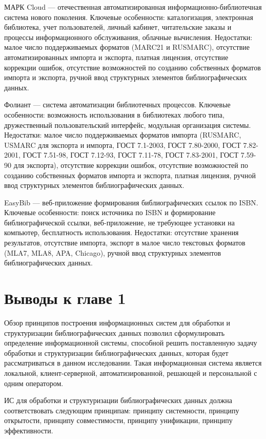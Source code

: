 МАРК Cloud — отечественная автоматизированная информационно-библиотечная система нового поколения.
Ключевые особенности: каталогизация, электронная библиотека, учет пользователей, личный кабинет, читательские заказы и процессы информационного обслуживания, облачные вычисления.
Недостатки: малое число поддерживаемых форматов (MARC21 и RUSMARC), отсутствие автоматизированных импорта и экспорта, платная лицензия, отсутствие коррекции ошибок, отсутствие возможностей по созданию собственных форматов импорта и экспорта, ручной ввод структурных элементов библиографических данных.

Фолиант — система автоматизации библиотечных процессов.
Ключевые особенности: возможность использования в библиотеках любого типа, дружественный пользовательский интерфейс, модульная организация системы.
Недостатки: малое число поддерживаемых форматов импорта (RUSMARC, USMARC для экспорта и импорта, ГОСТ 7.1-2003, ГОСТ 7.80-2000, ГОСТ 7.82-2001, ГОСТ 7.51-98, ГОСТ 7.12-93, ГОСТ 7.11-78, ГОСТ 7.83-2001, ГОСТ 7.59-90 для экспорта), отсутствие коррекции ошибок, отсутствие возможностей по созданию собственных форматов импорта и экспорта, платная лицензия, ручной ввод структурных элементов библиографических данных.

EasyBib — веб-приложение формирования библиографических ссылок по ISBN.
Ключевые особенности: поиск источника по ISBN и формирование библиографической ссылки, веб-приложение, не требующее установки на компьютер, бесплатность использования.
Недостатки: отсутствие хранения результатов, отсутствие импорта, экспорт в малое число текстовых форматов (MLA7, MLA8, APA, Chicago), ручной ввод структурных элементов библиографических данных.

\section*{Выводы к главе 1}

Обзор принципов построения информационных систем для обработки и структуризации библиографических данных позволил сформулировать определение информационной системы, способной решить поставленную задачу обработки и структуризации библиографических данных, которая будет рассматриваться в данном исследовании. Такая информационная система является локальной, клиент-серверной, автоматизированной, решающей и персональной с одним оператором.

ИС для обработки и структуризации библиографических данных должна соответствовать следующим принципам: принципу системности, принципу открытости, принципу совместимости, принципу унификации, принципу эффективности.

